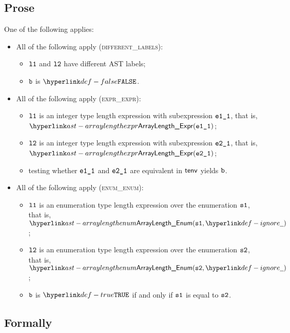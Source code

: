 \subsection{Prose}
One of the following applies:
\begin{itemize}
  \item All of the following apply (\textsc{different\_labels}):
  \begin{itemize}
    \item $\texttt{l1}$ and $\texttt{l2}$ have different AST labels;
    \item $\texttt{b}$ is $\False$.
  \end{itemize}

  \item All of the following apply (\textsc{expr\_expr}):
  \begin{itemize}
    \item $\texttt{l1}$ is an integer type length expression with subexpression $\texttt{e1\_1}$, that is, \\ $\ArrayLengthExpr(\veoneone)$;
    \item $\texttt{l2}$ is an integer type length expression with subexpression $\texttt{e2\_1}$, that is, \\ $\ArrayLengthExpr(\vetwoone)$;
    \item testing whether $\texttt{e1\_1}$ and $\texttt{e2\_1}$ are equivalent in $\textsf{tenv}$ yields $\texttt{b}$\ProseOrTypeError.
  \end{itemize}

  \item All of the following apply (\textsc{enum\_enum}):
  \begin{itemize}
    \item $\texttt{l1}$ is an enumeration type length expression over the enumeration $\texttt{s1}$, that is, $\ArrayLengthEnum(\vsone, \Ignore)$;
    \item $\texttt{l2}$ is an enumeration type length expression over the enumeration $\texttt{s2}$, that is, $\ArrayLengthEnum(\vstwo, \Ignore)$;
    \item $\texttt{b}$ is $\True$ if and only if $\texttt{s1}$ is equal to $\texttt{s2}$.
  \end{itemize}
\end{itemize}

\subsection{Formally}

